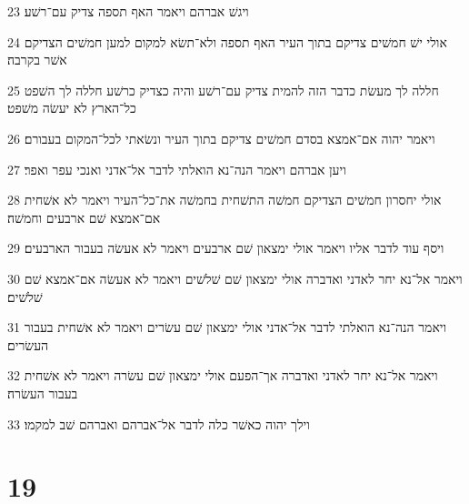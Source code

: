 \par 23 ויגשׁ אברהם ויאמר האף תספה צדיק עם־רשׁע׃
\par 24 אולי ישׁ חמשׁים צדיקם בתוך העיר האף תספה ולא־תשׂא למקום למען חמשׁים הצדיקם אשׁר בקרבה׃
\par 25 חללה לך מעשׂת כדבר הזה להמית צדיק עם־רשׁע והיה כצדיק כרשׁע חללה לך השׁפט כל־הארץ לא יעשׂה משׁפט׃
\par 26 ויאמר יהוה אם־אמצא בסדם חמשׁים צדיקם בתוך העיר ונשׂאתי לכל־המקום בעבורם׃
\par 27 ויען אברהם ויאמר הנה־נא הואלתי לדבר אל־אדני ואנכי עפר ואפר׃
\par 28 אולי יחסרון חמשׁים הצדיקם חמשׁה התשׁחית בחמשׁה את־כל־העיר ויאמר לא אשׁחית אם־אמצא שׁם ארבעים וחמשׁה׃
\par 29 ויסף עוד לדבר אליו ויאמר אולי ימצאון שׁם ארבעים ויאמר לא אעשׂה בעבור הארבעים׃
\par 30 ויאמר אל־נא יחר לאדני ואדברה אולי ימצאון שׁם שׁלשׁים ויאמר לא אעשׂה אם־אמצא שׁם שׁלשׁים׃
\par 31 ויאמר הנה־נא הואלתי לדבר אל־אדני אולי ימצאון שׁם עשׂרים ויאמר לא אשׁחית בעבור העשׂרים׃
\par 32 ויאמר אל־נא יחר לאדני ואדברה אך־הפעם אולי ימצאון שׁם עשׂרה ויאמר לא אשׁחית בעבור העשׂרה׃
\par 33 וילך יהוה כאשׁר כלה לדבר אל־אברהם ואברהם שׁב למקמו׃

\chapter{19}

